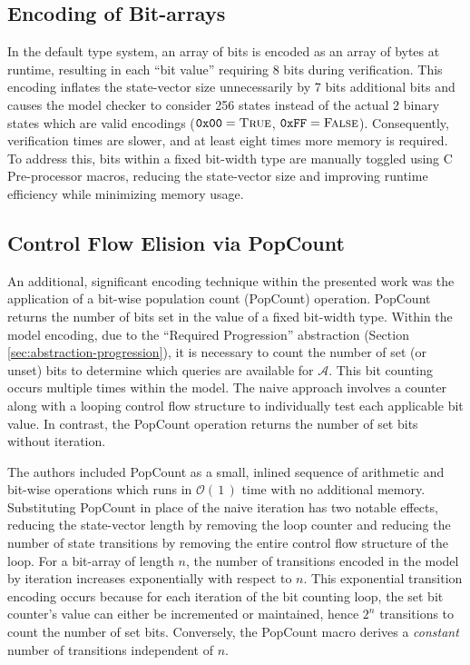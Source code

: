 \documentclass[runningheads]{llncs}
\newcommand{\Adversary}{\ensuremath{\mathcal{A}}\xspace}
\newcommand{\BigO}[1]{\ensuremath{\mathcal{O}\left(\,#1\,\right)}\xspace}
\begin{document}
\subsection{Encoding  of Bit-arrays\label{sec:bit-array}}

In the default \Promela type system, an array of bits is encoded as an array of bytes at runtime, resulting in each ``bit value'' requiring 8 bits during verification.
This encoding inflates the state-vector size unnecessarily by 7 bits additional bits and causes the model checker to consider 256 states instead of the actual 2 binary states which are valid encodings ($\texttt{0x00} = \textsc{True}$, $\texttt{0xFF} = \textsc{False}$).
Consequently, verification times are slower, and at least eight times more memory is required.
To address this, 
bits within a fixed bit-width \Promela type are manually toggled using C Pre-processor macros,
reducing the state-vector size and improving runtime efficiency while minimizing memory usage.


\subsection{Control Flow Elision via PopCount\label{sec:popcount}}

An additional, significant \Promela encoding technique within the presented work was the application of a bit-wise population count (PopCount) operation.
PopCount returns the number of bits set in the value of a fixed bit-width type.
Within the model encoding, due to the ``Required Progression''  abstraction (Section \ref{sec:abstraction-progression}), it is necessary to count the number of set (or unset) bits to determine which queries are available for \Adversary.
This bit counting occurs multiple times within the model.
The naive approach involves a counter along with a looping control flow structure to individually test each applicable bit value.
In contrast, the PopCount operation returns the number of set bits without iteration.

The authors included PopCount as a small, inlined sequence of arithmetic and bit-wise operations which runs in \BigO{1} time with no additional memory.
Substituting PopCount in place of the naive iteration has two notable effects, reducing the state-vector length by removing the loop counter and reducing the number of state transitions by removing the entire control flow structure of the loop.
For a bit-array of length $n$, the number of transitions encoded in the model by iteration increases exponentially with respect to $n$. This exponential transition encoding occurs because for each iteration of the bit counting loop, the set bit counter's value can either be incremented or maintained, hence $2^{n}$ transitions to count the number of set bits.
Conversely, the PopCount macro derives a \emph{constant} number of transitions independent of $n$.
\end{document}
